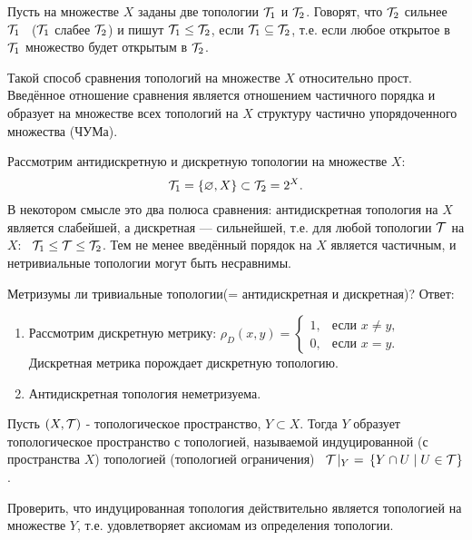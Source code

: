 \begin{definition}
    Пусть на множестве $X$ заданы две топологии $\mathcal{T}_1$ и $\mathcal{T}_2$. Говорят, что $\mathcal{T}_2$ сильнее $\mathcal{T}_1$ \ ($\mathcal{T}_1$ слабее $\mathcal{T}_2$) и пишут $\mathcal{T}_1 \leq \mathcal{T}_2$, если $\mathcal{T}_1 \subseteq \mathcal{T}_2$, т.е. если любое открытое в $\mathcal{T}_1$ множество будет открытым в $\mathcal{T}_2$.
\end{definition}
Такой способ сравнения топологий на множестве $X$ относительно прост. Введённое отношение сравнения является отношением частичного порядка и образует на множестве всех топологий на $X$ структуру частично упорядоченного множества (ЧУМа).

\begin{example}
    Рассмотрим антидискретную и дискретную топологии на множестве $X$: 
    \[
        \mathcal{T}_1 = \left\{\varnothing, X\right\} \subset \mathcal{T}_2 = 2^{X}.
    \]
    В некотором смысле это два полюса сравнения: антидискретная топология на $X$ является слабейшей, а дискретная --- сильнейшей, т.е. для любой топологии $\mathcal{T}$ на $X$: \, $\mathcal{T}_1 \leq \mathcal{T} \leq \mathcal{T}_2$. Тем не менее введённый порядок на $X$ является частичным, и нетривиальные топологии могут быть несравнимы.
\end{example}

\begin{exercise}
    Метризумы ли тривиальные топологии(= антидискретная и дискретная)?
    Ответ:
    \begin{enumerate}
        \item Рассмотрим дискретную метрику: $\rho_{D}(x, y) =
        \begin{cases}
            1, &\text{если $x \neq y$,} \\
            0, &\text{если $x = y$.}
        \end{cases} $
        Дискретная метрика порождает дискретную топологию.
        \item Антидискретная топология неметризуема.
    \end{enumerate}
\end{exercise}

\begin{definition}
    Пусть $(X, \mathcal{T})$ - топологическое пространство, $Y \subset X$. Тогда $Y$ образует топологическое пространство с топологией, называемой индуцированной (с пространства $X$) топологией (топологией ограничения) \ $\mathcal{T}\!\mid_{Y} \ = \, \left\{Y \cap U \mid U \in \mathcal{T}\right\}$.
\end{definition}
\begin{exercise}
    Проверить, что индуцированная топология действительно является топологией на множестве $Y$, т.е. удовлетворяет аксиомам из определения топологии.
\end{exercise}

